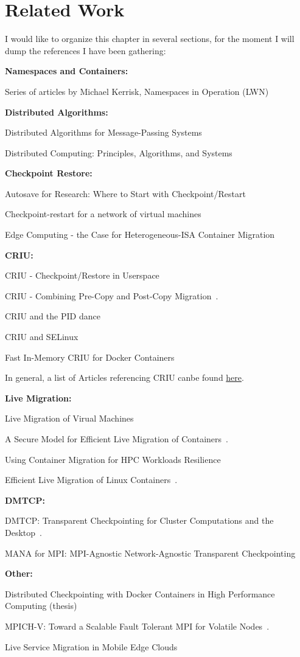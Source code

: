 \chapter{Related Work} \label{chap:related-work}

I would like to organize this chapter in several sections, for the moment I will dump the references I have been gathering:

\textbf{Namespaces and Containers:}

Series of articles by Michael Kerrisk, Namespaces in Operation (LWN)~\cite{Kerrisk2013}

\textbf{Distributed Algorithms:}

Distributed Algorithms for Message-Passing Systems~\cite{Raynal2013}

Distributed Computing: Principles, Algorithms, and Systems~\cite{Kshemkalyani2008}

\textbf{Checkpoint Restore:}

Autosave for Research: Where to Start with Checkpoint/Restart~\cite{Barker2014}

Checkpoint-restart for a network of virtual machines~\cite{Garg2013}

Edge Computing - the Case for Heterogeneous-ISA Container Migration~\cite{Barbalace2020}

\textbf{CRIU:}

CRIU - Checkpoint/Restore in Userspace~\cite{Reber2016}

CRIU - Combining Pre-Copy and Post-Copy Migration~\cite{Reber2016b}.

CRIU and the PID dance~\cite{Reber2019}

CRIU and SELinux~\cite{Reber2019b}

Fast In-Memory CRIU for Docker Containers~\cite{Venkatesh2019}

In general, a list of Articles referencing CRIU canbe found \href{https://criu.org/Articles}{here}.

\textbf{Live Migration:}

Live Migration of Virual Machines~\cite{Clark2005}

A Secure Model for Efficient Live Migration of Containers~\cite{Mavus2019}.

Using Container Migration for HPC Workloads Resilience~\cite{Sindi2019}

Efficient Live Migration of Linux Containers~\cite{Stoyanov2018}.

\textbf{DMTCP:}

DMTCP: Transparent Checkpointing for Cluster Computations and the Desktop~\cite{Ansel2009}.

MANA for MPI: MPI-Agnostic Network-Agnostic Transparent Checkpointing~\cite{Garg2019}

\textbf{Other:}

Distributed Checkpointing with Docker Containers in High Performance Computing (thesis)~\cite{Berg2017}

MPICH-V: Toward a Scalable Fault Tolerant MPI for Volatile Nodes~\cite{Bosilca2002}.

Live Service Migration in Mobile Edge Clouds~\cite{Machen2018}
